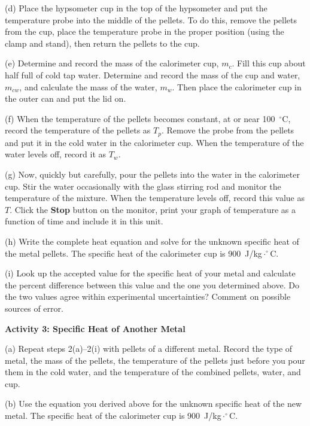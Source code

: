 (d) Place the hypsometer cup in the top of the hypsometer and put the temperature probe into the middle of the pellets.  To do this, remove the pellets from the cup, place the temperature probe in the proper position (using the clamp and stand), then return the pellets to the cup.

(e) Determine and record the mass of the calorimeter cup, $m_c$.
Fill this cup about half full of cold tap water. Determine and record
the mass of the cup and water, $m_{cw}$, and calculate the mass
of the water, $m_w$. Then place the calorimeter cup in the outer
can and put the lid on.
\vspace{15mm}

(f) When the temperature of the pellets becomes constant, at or near
100~$^{\circ }$C, record the temperature of the pellets as $T_{p}$.
Remove the probe from the pellets and put it in the cold water in the calorimeter cup. When the temperature of the water levels off, record it as $T_{w}$.
\vspace{15mm}

\pagebreak[3]
(g) Now, quickly but carefully, pour the pellets into the water in
the calorimeter cup. Stir the water occasionally with the glass stirring rod and
monitor the temperature of the mixture. When the temperature levels off, record
this value as $T$. Click the {\bf Stop} button on the monitor, print your graph of temperature as a function of time and include it in this unit.
\answerspace{20mm}

(h) Write the complete heat equation and solve for the unknown specific
heat of the metal pellets.
The specific heat of the calorimeter cup is 900~J/kg$\cdot^{\circ}$C.
\answerspace{1.8in}

(i) Look up the accepted value for the specific heat of your metal and
calculate the percent difference between this value and the one you
determined above. Do the two values agree within experimental uncertainties?
Comment on possible sources of error.
\answerspace{20mm}

\textbf{Activity 3: Specific Heat of Another Metal}

(a) Repeat steps 2(a)--2(i) with pellets of a different metal.
Record the type of metal, the mass of the pellets, the temperature of the
pellets just before you pour them in the cold water, and the temperature of the
combined pellets, water, and cup.
\answerspace{15mm}

(b) Use the equation you derived above for the unknown specific
heat of the new metal. 
The specific heat of the calorimeter cup is 900~J/kg$\cdot^{\circ}$C.

